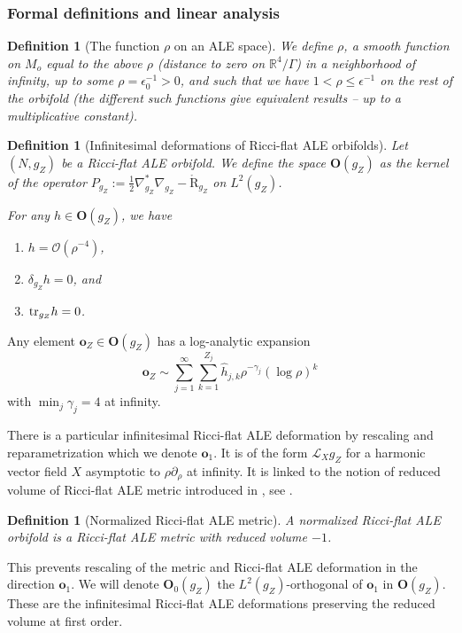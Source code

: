 \documentclass[12pt]{article}
\newtheorem{defn}[thm]{Definition}
\newcommand{\RR}{\mathbb R}
\begin{document}
\subsubsection{Formal definitions and linear analysis}

\begin{defn}[The function $\rho$ on an ALE space]\label{ro}
    We define $\rho$, a smooth function on $M_o$ equal to the above $\rho$ (distance to zero on $\RR^4\slash\Gamma$) in a neighborhood of infinity, up to some $\rho=\epsilon_0^{-1}>0$, and such that we have $1< \rho\leqslant\epsilon^{-1}$ on the rest of the orbifold (the different such functions give equivalent results -- up to a multiplicative constant). 
\end{defn}

\begin{defn}[Infinitesimal deformations of Ricci-flat ALE orbifolds]
    Let $(N,{g_Z})$ be a Ricci-flat ALE orbifold. We define the space $\mathbf{O}({g_Z})$ as the kernel of the operator $P_{{g_Z}}:= \frac{1}{2}\nabla_{{g_Z}}^*\nabla_{{g_Z}} - \mathring{\mathrm{R}}_{{g_Z}}$ on $L^2({g_Z})$.
    
    For any $h\in \mathbf{O}({g_Z})$, we have
    \begin{enumerate}
        \item $h = \mathcal{O}(\rho^{-4})$,
        \item $\delta_{{g_Z}}h=0$, and
        \item $ \textup{tr}_{{g_Z}}h=0 $.
    \end{enumerate}
\end{defn}
Any element $\mathbf{o}_Z\in\mathbf{O}({g_Z})$ has a log-analytic expansion
\begin{equation}
\mathbf{o}_Z \sim \sum_{j=1}^\infty\sum_{k=1}^{Z_j} \hat{h}_{j,k} \rho^{-\gamma_j} (\log \rho)^k
\label{gZ}
\end{equation}
with $\min_j\gamma_j = 4$ at infinity.

There is a particular infinitesimal Ricci-flat ALE deformation by rescaling and reparametrization which we denote $\mathbf{o}_1$. It is of the form $\mathcal{L}_{X}{g_Z}$ for a harmonic vector field $X$ asymptotic to $\rho\partial_{\rho}$ at infinity. It is linked to the notion of reduced volume of Ricci-flat ALE metric introduced in \cite{bh}, see \cite{ozu4}.
\begin{defn}[Normalized Ricci-flat ALE metric]
    A \emph{normalized Ricci-flat ALE orbifold} is a Ricci-flat ALE metric with reduced volume $-1$. 
\end{defn}
This prevents rescaling of the metric and Ricci-flat ALE deformation in the direction $\mathbf{o}_1$. We will denote $\mathbf{O}_0({g_Z})$ the $L^2({g_Z})$-orthogonal of $ \mathbf{o}_1 $ in $\mathbf{O}({g_Z})$. These are the infinitesimal Ricci-flat ALE deformations preserving the reduced volume at first order.
\end{document}
